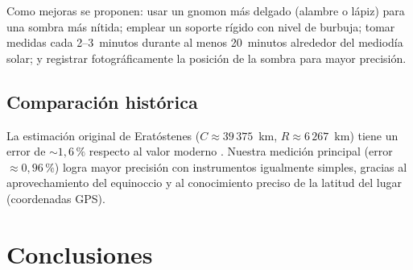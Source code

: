 \documentclass[12pt,a4paper]{article}
\begin{document}
Como mejoras se proponen: usar un gnomon más delgado (alambre o lápiz)
para una sombra más nítida; emplear un soporte rígido con nivel de
burbuja; tomar medidas cada 2--3~minutos durante al menos 20~minutos
alrededor del mediodía solar; y registrar fotográficamente la posición
de la sombra para mayor precisión.

\subsection{Comparación histórica}

La estimación original de Eratóstenes ($C \approx 39\,375$~km,
$R \approx 6\,267$~km) tiene un error de $\sim 1{,}6\,\%$ respecto al
valor moderno \citep{Britannica2024}.
Nuestra medición principal (error $\approx 0{,}96\,\%$) logra mayor
precisión con instrumentos igualmente simples, gracias al
aprovechamiento del equinoccio y al conocimiento preciso de la latitud
del lugar (coordenadas GPS).

\section{Conclusiones}
\end{document}

